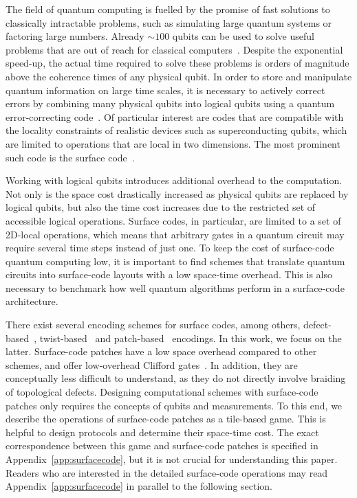 \documentclass[prx,aps,letterpaper,twocolumn,allowfontchageintitle=true,accepted=2019-02-01]{quantumarticle}
\begin{document}
The field of quantum computing is fuelled by the promise of fast solutions to classically intractable problems, such as simulating large quantum systems or factoring large numbers. Already ${\sim}100$ qubits can be used to solve useful problems that are out of reach for classical computers~\cite{Reiher2017,Babbush2018}. Despite the exponential speed-up, the actual time required to solve these problems is orders of magnitude above the coherence times of any physical qubit. In order to store and manipulate quantum information on large time scales, it is necessary to actively correct errors by combining many physical qubits into logical qubits using a quantum error-correcting code~\cite{Preskill1998,TerhalRMP,Campbell2016}. Of particular interest are codes that are compatible with the locality constraints of realistic devices such as superconducting qubits, which are limited to operations that are local in two dimensions. The most prominent such code is the surface code~\cite{Kitaev2003,Fowler2012}. 




Working with logical qubits introduces additional overhead to the computation. Not only is the space cost drastically increased as physical qubits are replaced by logical qubits, but also the time cost increases due to the restricted set of accessible logical operations. Surface codes, in particular, are limited to a set of 2D-local operations, which means that arbitrary gates in a quantum circuit may require several time steps instead of just one. To keep the cost of surface-code quantum computing low, it is important to find schemes that translate quantum circuits into surface-code layouts with a low space-time overhead. This is also necessary to benchmark how well quantum algorithms perform in a surface-code architecture.  

There exist several encoding schemes for surface codes, among others, defect-based~\cite{Fowler2012}, twist-based~\cite{Bombin2010} and patch-based~\cite{Horsman2012} encodings. In this work, we focus on the latter. Surface-code patches have a low space overhead compared to other schemes, and offer low-overhead Clifford gates~\cite{Brown2017,Litinski2017b}. In addition, they are conceptually less difficult to understand, as they do not directly involve braiding of topological defects. Designing computational schemes with surface-code patches only requires the concepts of qubits and measurements. To this end, we describe the operations of surface-code patches as a tile-based game. This is helpful to design protocols and determine their space-time cost. The exact correspondence between this game and surface-code patches is specified in Appendix~\ref{app:surfacecode}, but it is not crucial for understanding this paper. Readers who are interested in the detailed surface-code operations may read Appendix~\ref{app:surfacecode} in parallel to the following section.
\end{document}
